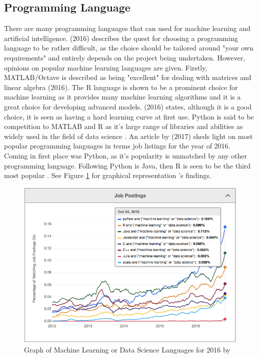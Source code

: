 \subsection{Programming Language}
There are many programming languages that can used for machine learning and artificial intelligence. \citeauthor{brownlee} (2016) describes the quest for choosing a programming language to be rather difficult, as the choice should be tailored around "your own requirements" and entirely depends on the project being undertaken. However, opinions on popular machine learning languages are given. Firstly, MATLAB/Octave is described as being "excellent" for dealing with matrices and linear algebra \citep{brownlee}(2016). The R language is shown to be a prominent choice for machine learning as it provides many machine learning algorithms and it is a great choice for developing advanced models. \citeauthor{brownlee}(2016) states, although it is a good choice, it is seen as having a hard learning curve at first use. Python is said to be competition to MATLAB and R as it's large range of libraries and abilities as widely used in the field of data science \citep{brownlee}.
An article by \citeauthor{verma_2017} (2017) sheds light on most popular programming languages in terms job listings for the year of 2016. Coming in first place was Python, as it's popularity is unmatched by any other programming language. Following Python is Java, then R is seen to be the third most popular \citep{verma_2017}. See Figure \ref{verma} for graphical representation \citeauthor{verma_2017}'s findings.

\begin{figure}[ht]
	\begin{center}
		\advance\leftskip-3cm
		\advance\rightskip-3cm
		\includegraphics[keepaspectratio=true,scale=0.6]{__resources/research/top_lang.jpg}
		\caption{Graph of Machine Learning or Data Science Languages for 2016 by \cite{verma_2017}}
		\label{verma}
	\end{center}
\end{figure}

